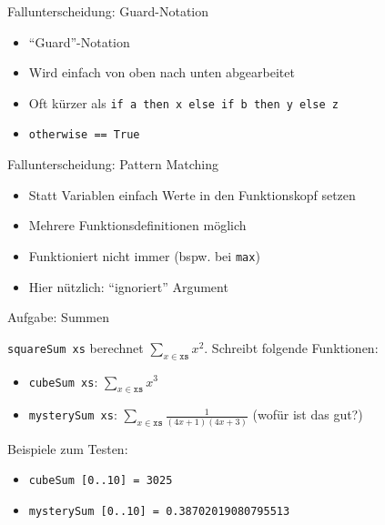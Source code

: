 \documentclass{beamer}
\begin{document}
\begin{frame}{Fallunterscheidung: Guard-Notation}

        \begin{itemize}
                \item \enquote{Guard}-Notation
                \item Wird einfach von oben nach unten abgearbeitet
                \item Oft kürzer als \texttt{if a then x else if b then y else z}
                \pause
                \item \texttt{otherwise == True}
        \end{itemize}
\end{frame}

\begin{frame}{Fallunterscheidung: Pattern Matching}

        \begin{itemize}
                \item Statt Variablen einfach Werte in den Funktionskopf setzen
                \item Mehrere Funktionsdefinitionen möglich
                \item Funktioniert nicht immer (bspw. bei \texttt{max})
                \item Hier nützlich: \texttt{\textunderscore} \enquote{ignoriert} Argument
        \end{itemize}
\end{frame}

\begin{frame}{Aufgabe: Summen}

  \texttt{squareSum xs} berechnet $\sum\limits_{x \in \texttt{xs}} x^2$.
  Schreibt folgende Funktionen:

  \begin{itemize}
    \item \texttt{cubeSum xs}: $\sum\limits_{x \in \texttt{xs}} x^3$
    \item \texttt{mysterySum xs}: $\sum\limits_{x \in \texttt{xs}} \frac{1}{(4x + 1)(4x + 3)}$ (wofür ist das gut?)
  \end{itemize}

  Beispiele zum Testen:

  \begin{itemize}
    \item \texttt{cubeSum [0..10] = 3025}
    \item \texttt{mysterySum [0..10] = 0.38702019080795513}
  \end{itemize}
\end{frame}
\end{document}
